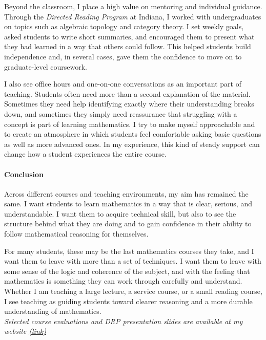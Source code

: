 \documentclass[11pt]{article}
\begin{document}
Beyond the classroom, I place a high value on mentoring and individual guidance. Through the \emph{Directed Reading Program} at Indiana, I worked with undergraduates on topics such as algebraic topology and category theory. I set weekly goals, asked students to write short summaries, and encouraged them to present what they had learned in a way that others could follow. This helped students build independence and, in several cases, gave them the confidence to move on to graduate-level coursework.

I also see office hours and one-on-one conversations as an important part of teaching. Students often need more than a second explanation of the material. Sometimes they need help identifying exactly where their understanding breaks down, and sometimes they simply need reassurance that struggling with a concept is part of learning mathematics. I try to make myself approachable and to create an atmosphere in which students feel comfortable asking basic questions as well as more advanced ones. In my experience, this kind of steady support can change how a student experiences the entire course.

\paragraph{Conclusion}\quad

Across different courses and teaching environments, my aim has remained the same. I want students to learn mathematics in a way that is clear, serious, and understandable. I want them to acquire technical skill, but also to see the structure behind what they are doing and to gain confidence in their ability to follow mathematical reasoning for themselves.

For many students, these may be the last mathematics courses they take, and I want them to leave with more than a set of techniques. I want them to leave with some sense of the logic and coherence of the subject, and with the feeling that mathematics is something they can work through carefully and understand. Whether I am teaching a large lecture, a service course, or a small reading course, I see teaching as guiding students toward clearer reasoning and a more durable understanding of mathematics. \\

\hfill
\noindent \textit{ \small Selected course evaluations and DRP presentation slides are available at my website \href{https://sites.google.com/view/myungsin-cho/teaching?authuser=0}{(link)}}
\end{document}
